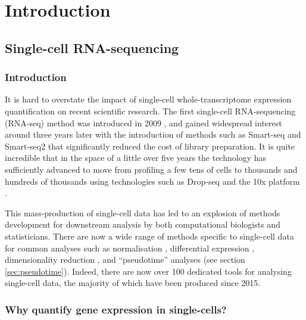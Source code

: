 \chapter{Introduction}\label{ch:introduction}

\section{Single-cell RNA-sequencing}

\subsection{Introduction}

It is hard to overstate the impact of single-cell whole-transcriptome expression quantification on recent scientific research. The first single-cell RNA-sequencing (RNA-seq) method was introduced in 2009 \cite{Tang2009-th}, and gained widespread interest around three years later with the introduction of methods such as Smart-seq \cite{Ramskold2012-wt} and Smart-seq2 \cite{Picelli2013-tm} that significantly reduced the cost of library preparation. It is quite incredible that in the space of a little over five years the technology has sufficiently advanced to move from profiling a few tens of cells to thousands and hundreds of thousands using technologies such as Drop-seq \cite{Macosko2015-ek} and the 10x platform \cite{Zheng2017-vj}.

This mass-production of single-cell data has led to an explosion of methods development for downstream analysis by both computational biologists and statisticians. There are now a wide range of methods specific to single-cell data for common analyses such as normalisation \cite{Lun2016-oj,Bacher2017-ga}, differential expression \cite{Kharchenko2014,Delmans2016-po,Korthauer2016-iz}, dimensionality reduction \cite{pierson2015zifa,Wang2017-dl}, and ``pseudotime'' analyses (see section \ref{sec:pseudotime}). Indeed, there are now over 100 dedicated tools for analysing single-cell data, 
the majority of which have been produced since 2015.

\subsection{Why quantify gene expression in single-cells?}

